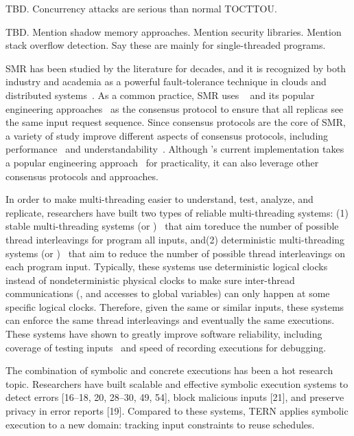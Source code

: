 TBD. Concurrency attacks are serious than normal 
TOCTTOU.

 TBD.
Mention shadow memory approaches.
Mention security libraries.
Mention stack overflow detection.
Say these are mainly for single-threaded programs.

  SMR has been studied by the literature 
for decades, and it is recognized by both industry and academia as a powerful 
fault-tolerance technique in clouds and distributed 
systems~\cite{lamportclock,smr:tutorial}. As a common practice, SMR uses 
\paxos~\cite{paxos,paxos:simple,paxos:complex} and its popular engineering 
approaches~\cite{paxos:live,paxos:practical} as the consensus protocol to 
ensure that all replicas see the same input request sequence. Since consensus 
protocols are the core of SMR, a variety of study improve different aspects of 
consensus protocols, including performance~\cite{epaxos:sosp13,paxos:fast} and 
understandability~\cite{raft:usenix14}. Although \xxx's current implementation 
takes a popular engineering approach~\cite{paxos:practical} for practicality, 
it can also leverage other consensus protocols and approaches.

  In order to make multi-threading easier to 
understand, test, analyze, and replicate, researchers have built two types of 
reliable multi-threading systems: (1) stable multi-threading systems (or 
\smt)~\cite{grace:oopsla09, dthreads:sosp11, determinator:osdi10} 
that aim toreduce the number of possible thread interleavings for program all 
inputs, and(2) deterministic multi-threading systems (or 
\dmt)~\cite{dpj:oopsla09,dmp:asplos09,kendo:asplos09,coredet:asplos10,
dos:osdi10,ddos:asplos13, ics:oopsla13} that aim to reduce the number of 
possible thread interleavings on each program input. Typically, these systems 
use deterministic logical clocks 
instead of nondeterministic physical clocks to make sure inter-thread 
communications (\eg, \mutexlock and accesses to global variables) can only 
happen at some specific logical clocks. Therefore, given the same or similar 
inputs, these systems can enforce the same thread interleavings and eventually 
the same executions. These systems 
have shown to greatly improve software reliability, including coverage of 
testing inputs~\cite{ics:oopsla13} and speed of recording 
executions\cite{dos:osdi10} for debugging.


 The combination of symbolic and
concrete executions has been a hot research topic. Researchers
have built scalable and effective symbolic execution
systems to detect errors [16–18, 20, 28–30, 49,
54], block malicious inputs [21], and preserve privacy in
error reports [19]. Compared to these systems, TERN applies
symbolic execution to a new domain: tracking input
constraints to reuse schedules.

